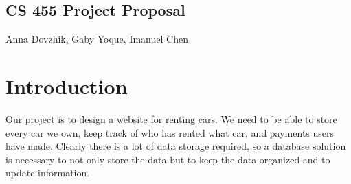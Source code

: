 \documentclass[12pt]{article}
\begin{document}
\begin{center}
\section*{CS 455 Project Proposal}
Anna Dovzhik, Gaby Yoque, Imanuel Chen
\end{center}

\section{Introduction}

Our project is to design a website for renting cars. We need to be able to store every car we own, keep track of who has rented what car, and payments users have made. Clearly there is a lot of data storage required, so a database solution is necessary to not only store the data but to keep the data organized and to update information.
\end{document}
